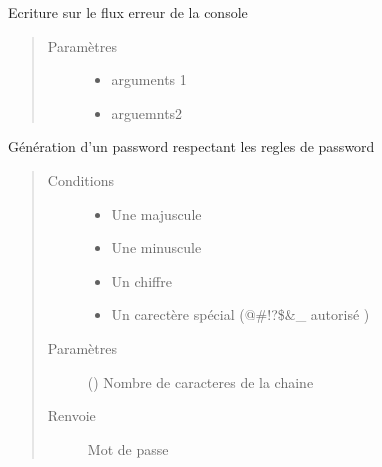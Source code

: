 \documentclass[letterpaper,10pt,french]{sphinxmanual}
\begin{document}
\begin{fulllineitems}
\label{\detokenize{modules/tools:toolbox.tools.print_err}}
Ecriture sur le flux erreur de la console
\begin{quote}\begin{description}
\item[{Paramètres}] \leavevmode\begin{itemize}
\item {} 
 \textendash{} arguments 1

\item {} 
 \textendash{} arguemnts2

\end{itemize}

\end{description}\end{quote}

\end{fulllineitems}


\begin{fulllineitems}
\label{\detokenize{modules/tools:toolbox.tools.pwd_maker}}
Génération d’un password respectant les regles de password
\begin{quote}\begin{description}
\item[{Conditions}] \leavevmode\begin{itemize}
\item {} 
Une majuscule

\item {} 
Une minuscule

\item {} 
Un chiffre

\item {} 
Un carectère spécial (@\#!?\$\&\sphinxhyphen{}\_ autorisé )

\end{itemize}

\item[{Paramètres}] \leavevmode
{} () \textendash{} Nombre de caracteres de la chaine

\item[{Renvoie}] \leavevmode
Mot de passe

\end{description}\end{quote}

\end{fulllineitems}
\end{document}
